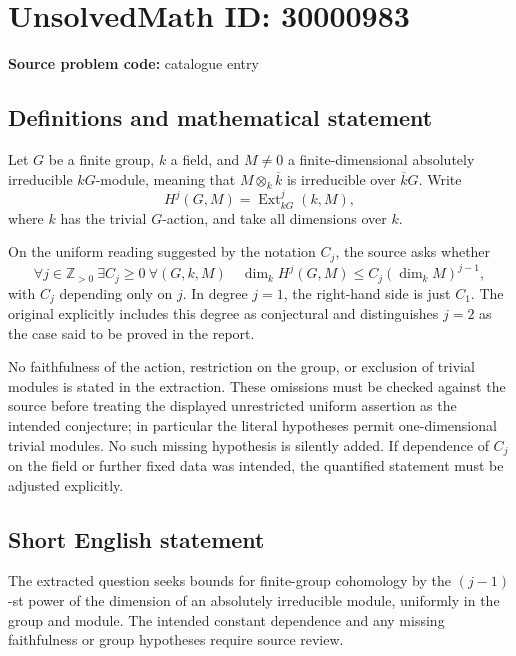 \documentclass[11pt]{article}
\newcommand{\Z}{\mathbb{Z}}
\begin{document}
\section*{UnsolvedMath ID: 30000983}
\textbf{Source problem code:} catalogue entry
\subsection{Definitions and mathematical statement}
Let \(G\) be a finite group, \(k\) a field, and \(M\ne0\) a finite-dimensional absolutely irreducible \(kG\)-module, meaning that \(M\otimes_k\overline{k}\) is irreducible over \(\overline{k}G\). Write
\[
H^j(G,M)=\operatorname{Ext}^j_{kG}(k,M),
\]
where \(k\) has the trivial \(G\)-action, and take all dimensions over \(k\).

On the uniform reading suggested by the notation \(C_j\), the source asks whether
\[
\forall j\in\Z_{>0}\ \exists C_j\geq0\ \forall(G,k,M)\quad
\dim_k H^j(G,M)\leq C_j(\dim_k M)^{j-1},
\]
with \(C_j\) depending only on \(j\). In degree \(j=1\), the right-hand side is just \(C_1\). The original explicitly includes this degree as conjectural and distinguishes \(j=2\) as the case said to be proved in the report.

No faithfulness of the action, restriction on the group, or exclusion of trivial modules is stated in the extraction. These omissions must be checked against the source before treating the displayed unrestricted uniform assertion as the intended conjecture; in particular the literal hypotheses permit one-dimensional trivial modules. No such missing hypothesis is silently added. If dependence of \(C_j\) on the field or further fixed data was intended, the quantified statement must be adjusted explicitly.
\subsection{Short English statement}
The extracted question seeks bounds for finite-group cohomology by the \((j-1)\)-st power of the dimension of an absolutely irreducible module, uniformly in the group and module. The intended constant dependence and any missing faithfulness or group hypotheses require source review.
\end{document}
